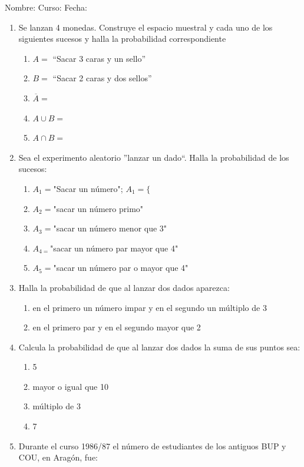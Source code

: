 \documentclass[fleqn]{article}
\newcommand{\LineaNombre}{%
\par
\vspace{\baselineskip}
Nombre:\hrulefill \; Curso: \underline{\hspace*{48pt}} \; Fecha: \underline{\hspace*{2.5cm}} \relax
\par}
\begin{document}
\LineaNombre
\begin{enumerate}
 \item Se lanzan 4 monedas. Construye el espacio muestral y cada uno de los siguientes sucesos y halla la probabilidad correspondiente
 \begin{enumerate}
 \item $A=$ ``Sacar 3 caras y un sello'' \noanswer
 \item $B=$ ``Sacar 2 caras y dos sellos'' \noanswer
 \item $\overline{A}=$ \noanswer
 \item $A\cup B=$ \noanswer
 \item $A\cap B=$ \noanswer
 \end{enumerate}
 \item Sea el experimento aleatorio ''lanzar un dado``. Halla la probabilidad de los sucesos:
\begin{enumerate}
\item $A_{1}=$"Sacar un número"; $A_{1}=\{$ \noanswer
\item $A_{2}=$"sacar un número primo" \noanswer
\item $A_{3}=$"sacar un número menor que 3" \noanswer
\item $A_{4=}$"sacar un número par mayor que 4" \noanswer
\item $A_{5}=$"sacar un número par o mayor que 4"\noanswer
\end{enumerate}
  \newpage
\item Halla la probabilidad de que al lanzar dos dados aparezca:
\begin{enumerate}
  \item en el primero un número impar y en el segundo un múltiplo de 3 \noanswer
\item en el primero par y en el segundo mayor que 2 \noanswer
\end{enumerate}
\item Calcula la probabilidad de que al lanzar dos dados la suma de sus puntos sea:
\begin{enumerate}
\item 5 \noanswer
\item mayor o igual que 10 \noanswer
\item múltiplo de 3 \noanswer
\item 7 \noanswer
\end{enumerate}
\item Durante el curso 1986/87 el número de estudiantes de los antiguos BUP y COU, en Aragón, fue:


\end{enumerate}
\end{document}
